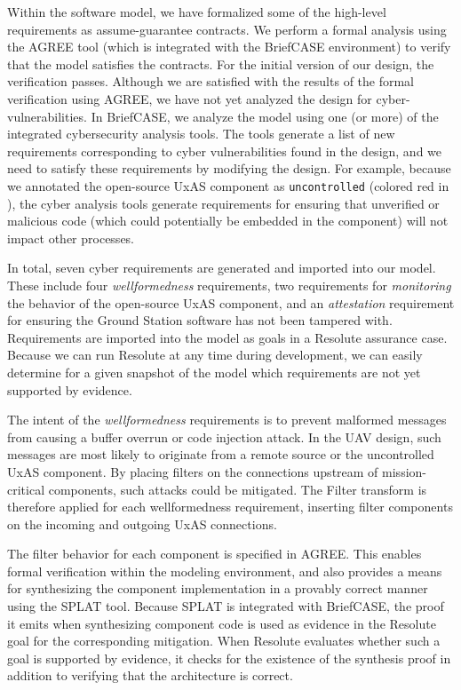 Within the software model, we have formalized some of the high-level requirements as assume-guarantee contracts.  We perform a formal analysis using the AGREE tool (which is integrated with the BriefCASE environment) to verify that the model satisfies the contracts.  For the initial version of our design, the verification passes.
%
Although we are satisfied with the results of the formal verification using AGREE, we have not yet analyzed the design for cyber-vulnerabilities.  
In BriefCASE, we analyze the model using one (or more) of the integrated cybersecurity analysis tools.  The tools generate a list of new requirements corresponding to cyber vulnerabilities found in the design,
and we need to satisfy these requirements by modifying the design.
%
For example, because we annotated the open-source UxAS component as \texttt{uncontrolled} (colored red in ), the cyber analysis tools generate requirements for ensuring that unverified or malicious code (which could potentially be embedded in the component) will not impact other processes. 

In total, seven cyber requirements are generated and imported into our model.  These include four \textit{wellformedness} requirements, two requirements for \textit{monitoring} the behavior of the open-source UxAS component, and an \textit{attestation} requirement for ensuring the Ground Station software has not been tampered with.  Requirements are imported into the model as goals in a Resolute assurance case.  Because we can run Resolute at any time during development, we can easily determine for a given snapshot of the model which requirements are not yet supported by evidence.

The intent of the \textit{wellformedness} requirements is to prevent malformed messages from causing a buffer overrun or code injection attack.  In the UAV design, such messages are most likely to originate from a remote source or the uncontrolled UxAS component.  By placing filters on the connections upstream of mission-critical components, such attacks could be mitigated.  The Filter transform is therefore applied for each wellformedness requirement, inserting filter components on the incoming and outgoing UxAS connections.  

The filter behavior for each component is specified in AGREE.  This enables formal verification within the modeling environment, and also provides a means for synthesizing the component implementation in a provably correct manner using the SPLAT tool.  Because SPLAT is integrated with BriefCASE, the proof it emits when synthesizing component code is used as evidence in the Resolute goal for the corresponding mitigation.  When Resolute evaluates whether such a goal is supported by evidence, it checks for the existence of the synthesis proof in addition to verifying that the architecture is correct.  

